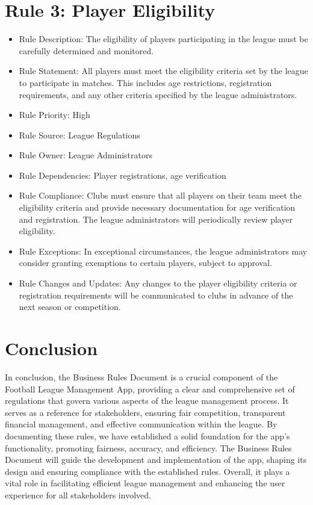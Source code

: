 \documentclass[12pt]{article}
\begin{document}
\section{Rule 3: Player Eligibility}
\begin{itemize}
\item Rule Description: The eligibility of players participating in the league must be carefully determined and monitored.
\item Rule Statement: All players must meet the eligibility criteria set by the league to participate in matches. This includes age restrictions, registration requirements, and any other criteria specified by the league administrators.
\item Rule Priority: High
\item Rule Source: League Regulations
\item Rule Owner: League Administrators
\item Rule Dependencies: Player registrations, age verification
\item Rule Compliance: Clubs must ensure that all players on their team meet the eligibility criteria and provide necessary documentation for age verification and registration. The league administrators will periodically review player eligibility.
\item Rule Exceptions: In exceptional circumstances, the league administrators may consider granting exemptions to certain players, subject to approval.
\item Rule Changes and Updates: Any changes to the player eligibility criteria or registration requirements will be communicated to clubs in advance of the next season or competition.
\end{itemize}


\section{Conclusion}
In conclusion, the Business Rules Document is a crucial component of the Football League Management App, providing a clear and comprehensive set of regulations that govern various aspects of the league management process. It serves as a reference for stakeholders, ensuring fair competition, transparent financial management, and effective communication within the league. By documenting these rules, we have established a solid foundation for the app's functionality, promoting fairness, accuracy, and efficiency. The Business Rules Document will guide the development and implementation of the app, shaping its design and ensuring compliance with the established rules. Overall, it plays a vital role in facilitating efficient league management and enhancing the user experience for all stakeholders involved.
\end{document}
